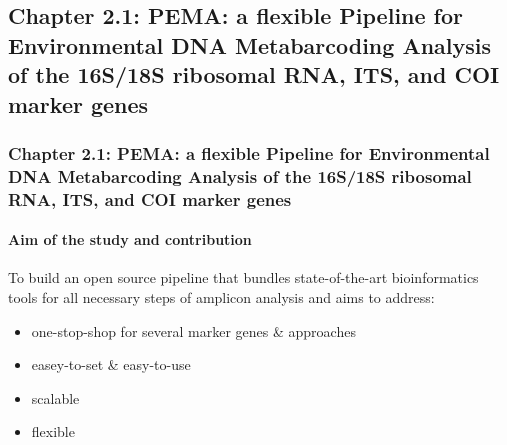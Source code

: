 \documentclass{beamer}
\begin{document}
   \begin{darkframes}
      \subsection{\textbf{Chapter 2.1}: PEMA: a flexible Pipeline for Environmental DNA Metabarcoding Analysis of the
      16S/18S ribosomal RNA, ITS, and COI marker genes}
   \end{darkframes}
   
   \begin{darkframes}
      \begin{frame}
         \frametitle{\textbf{Chapter 2.1}: PEMA: a flexible Pipeline for Environmental DNA Metabarcoding Analysis of the
         16S/18S ribosomal RNA, ITS, and COI marker genes}
         \framesubtitle{Aim of the study and contribution}

         To build an open source
         pipeline that bundles state-of-the-art bioinformatics tools for all necessary steps of
         amplicon analysis and aims to address:
         \begin{itemize}
            \item one-stop-shop for several marker genes \& approaches
            \item easey-to-set \& easy-to-use 
            \item scalable
            \item flexible
         \end{itemize}
      \end{frame}
   \end{darkframes}


         
         


\end{document}
